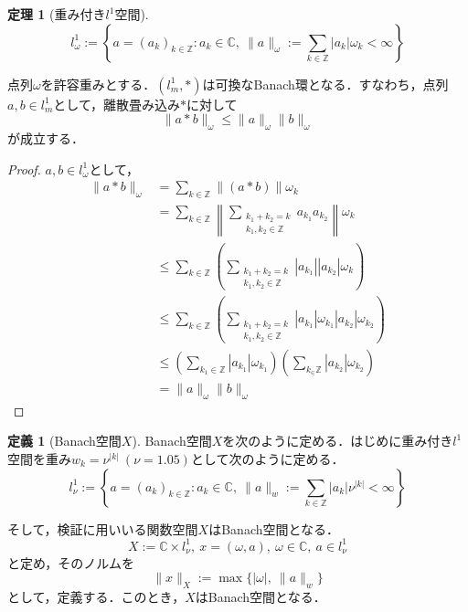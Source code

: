 \documentclass[11pt,a4paper,titlepage]{jsreport}
\theoremstyle{definition}
\newtheorem{dfn}{定義}
\newtheorem{thm}{定理}
\begin{document}
\begin{thm}[重み付き$l^1$空間]
  \label{thm:重み付きl1空間}
  \begin{equation*}
    l_\omega^1 := \left\{ a = (a_k)_{k\in\mathbb{Z}}:a_k\in\mathbb{C},\ \|a\|_\omega:=\sum_{k\in\mathbb{Z}}|a_k|\omega_k < \infty\right\}
  \end{equation*}

  点列$\omega$を許容重みとする．$\left(l_m^1, *\right)$は可換なBanach環となる．すなわち，点列$a,b\in l^1_m$として，離散畳み込み$*$に対して
  \begin{equation*}
    \|a*b\|_\omega \leq \|a\|_\omega\|b\|_\omega
  \end{equation*}
  が成立する．
\end{thm}

\begin{proof}
  $a,b\in l_{\omega}^1$として，
  \begin{equation*}
    \begin{split}
      \|a*b\|_\omega &= \sum_{k\in\mathbb{Z}} \|(a*b)\|\omega_k \\
      &= \sum_{k\in\mathbb{Z}} \left\|\sum_{\substack{k_1+k_2=k \\ k_1,k_2\in\mathbb{Z}}}a_{k_1} a_{k_2}\right\| \omega_k \\
      &\leq \sum_{k\in\mathbb{Z}} \left(\sum_{\substack{k_1+k_2=k \\ k_1,k_2\in\mathbb{Z}}}|a_{k_1}||a_{k_2}|\omega_k\right)\\
      &\leq \sum_{k\in\mathbb{Z}} \left(\sum_{\substack{k_1+k_2=k \\ k_1,k_2\in\mathbb{Z}}}|a_{k_1}|\omega_{k_1}|a_{k_2}|\omega_{k_2}\right)\\
      &\leq \left(\sum_{k_1\in\mathbb{Z}}|a_{k_1}|\omega_{k_1}\right) \left(\sum_{k_\in\mathbb{Z}}|a_{k_2}|\omega_{k_2}\right) \\
      &= \|a\|_\omega\|b\|_\omega
    \end{split}
  \end{equation*}
\end{proof}

\begin{dfn}[Banach空間$X$]
  \label{dfn:Banach空間X-重み付きl1空間}
  Banach空間$X$を次のように定める．はじめに重み付き$l^1$空間を重み$w_k=\nu^{|k|}\ (\nu=1.05)$として次のように定める．
  \begin{equation*}
    l_{\nu}^1 := \left\{ a = (a_k)_{k\in\mathbb{Z}}:a_k\in\mathbb{C},\ \|a\|_{w} := \sum_{k\in\mathbb{Z}}|a_k|\nu^{|k|} < \infty\right\}
  \end{equation*}

  そして，検証に用いいる関数空間$X$はBanach空間となる．
  \begin{equation*}
    X:=\mathbb{C}\times l_{\nu}^1,\ x=(\omega,a),\ \omega \in \mathbb{C},\ a\in l_{\nu}^1
  \end{equation*}
  と定め，そのノルムを
  \begin{equation*}
    \|x\|_X:=\max \{|\omega|,\ \|a\|_w \}
  \end{equation*}
  として，定義する．このとき，$X$はBanach空間となる．
\end{dfn}
\end{document}

